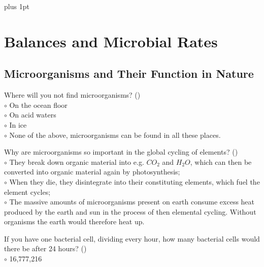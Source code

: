 \documentclass[]{beamer}
\begin{document}
\parskip=1cm plus 1pt
\section{Balances and Microbial Rates}

\subsection{Microorganisms and Their Function in Nature}
\setcounter{questions}{0}
\begin{frame}[shrink] {}
\addtocounter{questions}{1}
\color{blue}
Where will you not find microorganisms? ()\\
\color{black}
\setlength{\parindent}{-0.4cm}
{\color{red}$\circ$} On the ocean floor \\
{\color{red}$\circ$} On acid waters  \\
{\color{red}$\circ$} In ice  \\
{\color{red}$\circ$} None of the above, microorganisms can be found in all these places. \\
\end{frame}

\begin{frame}[shrink] {}
\addtocounter{questions}{1}
\color{blue}
Why are microorganisms so important in the global cycling of elements? ()\\
\color{black}
\setlength{\parindent}{-0.4cm}
{\color{red}$\circ$} They break down organic material into e.g. $CO_2$ and $H_2O$, which can
then be converted into organic material again by photosynthesis;\\
{\color{red}$\circ$} When they die, they disintegrate into their constituting elements,
which fuel the element cycles;\\
{\color{red}$\circ$} The massive amounts of microorganisms present on earth
consume excess heat produced by the earth and sun in the process of
then elemental cycling. Without organisms the earth would therefore heat up.
\end{frame}

\begin{frame}[shrink] {}
\addtocounter{questions}{1}
\color{blue}
If you have one bacterial cell, dividing every hour, how many bacterial
cells would there be after 24 hours? ()\\
\color{black}
\setlength{\parindent}{-0.4cm}
{\color{red}$\circ$} 16,777,216
\end{frame}
\end{document}
